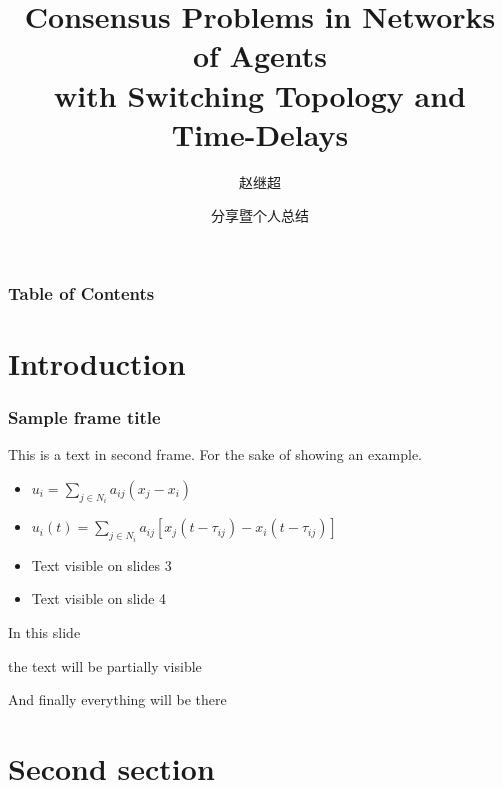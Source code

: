 \documentclass{beamer}
\title[About Beamer] %
{Consensus Problems in Networks of Agents\\ with Switching Topology and Time-Delays}
\author[] %
{赵继超}
\date[\today] %
{分享暨个人总结}
\begin{document}
\frame{\titlepage}


\begin{frame}
\frametitle{Table of Contents}
\tableofcontents
\end{frame}


\section{Introduction}

\begin{frame}
\frametitle{Sample frame title}
This is a text in second frame. For the sake of showing an example.

\begin{itemize}
    \item<1-> $u_i = \sum_{j\in N_i}a_{ij}(x_j-x_i)$
    \item<2-> $u_i(t) = \sum_{j\in N_i}a_{ij}[x_j(t-\tau_{ij})-x_i(t-\tau_{ij})]$
    \item<3> Text visible on slides 3
    \item<4-> Text visible on slide 4
\end{itemize}
\end{frame}



\begin{frame}
In this slide \pause

the text will be partially visible \pause

And finally everything will be there
\end{frame}

\section{Second section}
\end{document}
